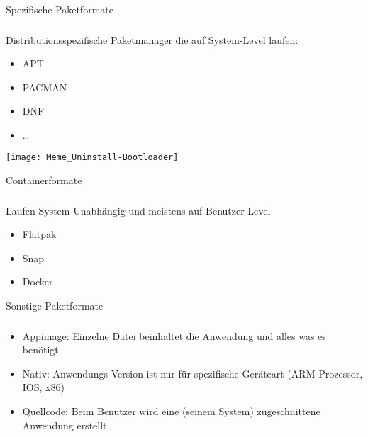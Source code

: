 \begin{frame}{Spezifische Paketformate}
    \subsubsection{}\label{subsubsec:spezifische-formate}

        Distributionsspezifische Paketmanager die auf System-Level laufen:
        \begin{itemize}
            \item<2-> APT
            \item<3-> PACMAN
            \item<4-> DNF
            \item<5-> \ldots
        \end{itemize}
    \endminipage\hfill
        \texttt{[image: Meme\_Uninstall-Bootloader]}
    \endminipage\hfill
\end{frame}

\begin{frame}{Containerformate}
    \subsubsection{}\label{subsubsec:containerformate}

    Laufen System-Unabhängig und meistens auf Benutzer-Level
    \pause

    \begin{itemize}
        \item Flatpak\pause
        \item Snap\pause
        \item Docker
    \end{itemize}

\end{frame}

\begin{frame}{Sonstige Paketformate}
    \subsubsection{}\label{subsubsec:sonstige-paketformate}

    \begin{itemize}
        \item Appimage: Einzelne Datei beinhaltet die Anwendung und alles was es benötigt\pause
        \item Nativ: Anwendungs-Version ist nur für spezifische Geräteart (ARM-Prozessor, IOS, x86)\pause
        \item Quellcode: Beim Benutzer wird eine (seinem System) zugeschnittene Anwendung erstellt.
    \end{itemize}

\end{frame}

